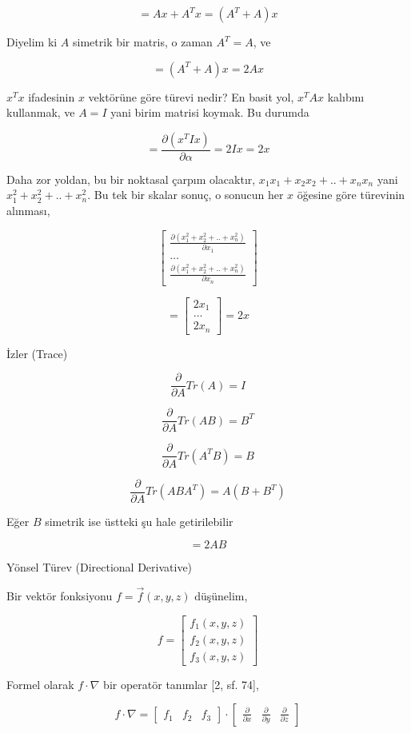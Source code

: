\documentclass[12pt,fleqn]{article}\usepackage{../../common}
\begin{document}
$$ 
= Ax + A^Tx  = (A^T+A) x
$$

Diyelim ki $A$ simetrik bir matris, o zaman $A^T=A$, ve

$$ 
= (A^T+A)x = 2Ax
$$

$x^Tx$ ifadesinin $x$ vektörüne göre türevi nedir? En basit yol, $x^TAx$
kalıbını kullanmak, ve $A = I$ yani birim matrisi koymak. Bu durumda 

$$ 
= \frac{\partial (x^TIx)}{\partial \alpha}  = 2Ix = 2x
 $$

Daha zor yoldan, bu bir noktasal çarpım olacaktır, $x_1x_1 + x_2x_2 + .. +
 x_nx_n$  yani $x_1^2 + x_2^2 + .. + x_n^2$. Bu tek bir skalar sonuç, o sonucun her
$x$ öğesine göre türevinin alınması,

$$ 
\left[\begin{array}{c}
\frac{\partial (x_1^2 + x_2^2 + .. + x_n^2)}{\partial x_1} \\
\dots \\
\frac{\partial (x_1^2 + x_2^2 + .. + x_n^2)}{\partial x_n} 
\end{array}\right]
 $$

$$ 
= \left[\begin{array}{c}
2x_1 \\
\dots \\
2x_n
\end{array}\right] = 
2x
 $$

İzler (Trace)

$$ \frac{\partial }{\partial A} Tr(A) = I $$

$$ \frac{\partial }{\partial A} Tr(AB) = B^T $$

$$ \frac{\partial }{\partial A} Tr(A^TB) = B $$


$$ \frac{\partial }{\partial A} Tr(ABA^T) = A(B + B^T) $$

Eğer $B$ simetrik ise üstteki şu hale getirilebilir

$$  = 2AB $$

Yönsel Türev (Directional Derivative)

Bir vektör fonksiyonu $f = \vec{f}(x,y,z)$ düşünelim, 

$$
f = \left[\begin{array}{r} f_1(x,y,z) \\ f_2(x,y,z) \\ f_3(x,y,z) \end{array}\right]
$$

Formel olarak $f \cdot \nabla$ bir operatör tanımlar [2, sf. 74],

$$
f \cdot \nabla = 
\left[\begin{array}{ccc} f_1 & f_2 & f_3 \end{array}\right]
\cdot 
\left[\begin{array}{ccc} 
\frac{\partial }{\partial x} & \frac{\partial }{\partial y} & \frac{\partial }{\partial z} 
\end{array}\right]
$$
\end{document}
